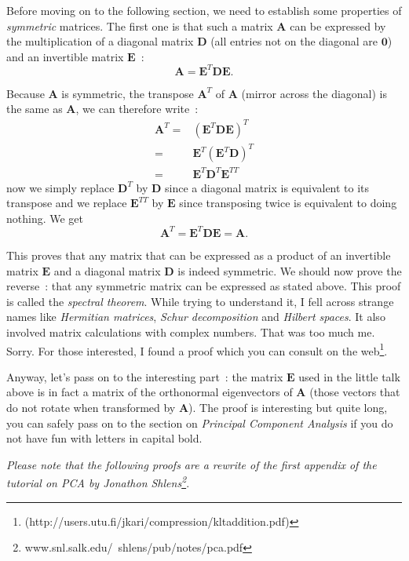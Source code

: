 \documentclass[11pt,twocolumn]{amsart} %
\newcommand{\ve}[1]{\boldsymbol{#1}}
\newcommand{\ma}[1]{\boldsymbol{#1}}
\begin{document}
Before moving on to the following section, we need to establish some properties of \emph{symmetric} matrices. The first one is that such a matrix $\ma{A}$ can be expressed by the multiplication of a diagonal matrix $\ma{D}$ (all entries not on the diagonal are $\ve{0}$) and an invertible matrix $\ma{E}$~:
\begin{equation}
  \ma{A} = \ma{E}^T\ma{D}\ma{E}. \label{symmetric}
\end{equation}

Because $\ma{A}$ is symmetric, the transpose $\ma{A}^T$ of $\ma{A}$ (mirror across the diagonal) is the same as $\ma{A}$, we can therefore write~:
\begin{align*}
  \ma{A}^T = & (\ma{E}^T\ma{D}\ma{E})^T \\
           = &  \ma{E}^T(\ma{E}^T\ma{D})^T \\
           = &  \ma{E}^T\ma{D}^T\ma{E}^{TT}
\end{align*}
now we simply replace $\ma{D}^T$ by $\ma{D}$ since a diagonal matrix is equivalent to its transpose and we replace $\ma{E}^{TT}$ by $\ma{E}$ since transposing twice is equivalent to doing nothing. We get
\[
  \ma{A}^T = \ma{E}^T\ma{D}\ma{E} = \ma{A}.
\]

This proves that any matrix that can be expressed as a product of an invertible matrix $\ma{E}$ and a diagonal matrix $\ma{D}$ is indeed symmetric. We should now prove the reverse~: that any symmetric matrix can be expressed as stated above. This proof is called the \emph{spectral theorem}. While trying to understand it, I fell across strange names like \emph{Hermitian matrices}, \emph{Schur decomposition} and \emph{Hilbert spaces}. It also involved matrix calculations with complex numbers. That was too much me. Sorry. For those interested, I found a proof which you can consult on the web\footnote{(http://users.utu.fi/jkari/compression/kltaddition.pdf)}.

Anyway, let's pass on to the interesting part~: the matrix $\ma{E}$ used in the little talk above is in fact a matrix of the orthonormal eigenvectors of $\ma{A}$ (those vectors that do not rotate when transformed by $\ma{A}$). The proof is interesting but quite long, you can safely pass on to the section on \emph{Principal Component Analysis} if you do not have fun with letters in capital bold.

\emph{Please note that the following proofs are a rewrite of the first appendix of the tutorial on PCA by Jonathon Shlens\footnote{www.snl.salk.edu/~shlens/pub/notes/pca.pdf}}.
\end{document}
